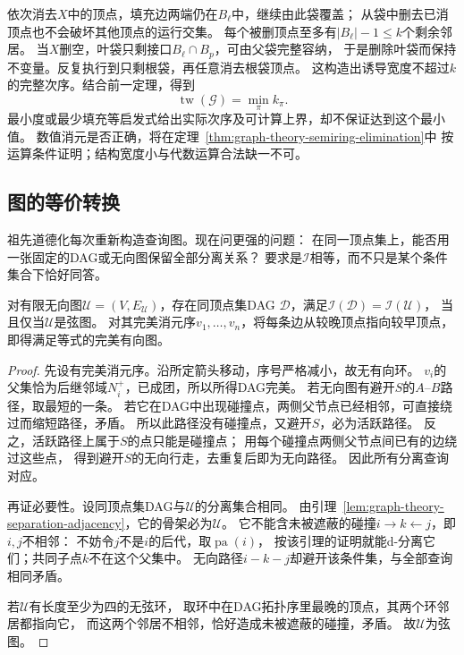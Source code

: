 依次消去\(X\)中的顶点，填充边两端仍在\(B_\ell\)中，继续由此袋覆盖；
从袋中删去已消顶点也不会破坏其他顶点的运行交集。
每个被删顶点至多有\(|B_\ell|-1\leq k\)个剩余邻居。
当\(X\)删空，叶袋只剩接口\(B_\ell\cap B_p\)，可由父袋完整容纳，
于是删除叶袋而保持不变量。反复执行到只剩根袋，再任意消去根袋顶点。
这构造出诱导宽度不超过\(k\)的完整次序。结合前一定理，得到
\[
  \operatorname{tw}(\mathcal G)=\min_\pi k_\pi.
\]
最小度或最少填充等启发式给出实际次序及可计算上界，却不保证达到这个最小值。
数值消元是否正确，将在定理~\ref{thm:graph-theory-semiring-elimination}中
按运算条件证明；结构宽度小与代数运算合法缺一不可。

\subsection{图的等价转换}
\label{sec:graph-theory-separation-correspondence}

祖先道德化每次重新构造查询图。现在问更强的问题：
在同一顶点集上，能否用一张固定的DAG或无向图保留全部分离关系？
要求是\(\mathcal I\)相等，而不只是某个条件集合下恰好同答。

\begin{theorem}[无向图的完美有向图表示]
  \label{thm:graph-theory-chordal-perfect}
  对有限无向图\(\mathcal U=(V,E_{\mathcal U})\)，存在同顶点集DAG
  \(\mathcal D\)，满足\(\mathcal I(\mathcal D)=\mathcal I(\mathcal U)\)，
  当且仅当\(\mathcal U\)是弦图。
  对其完美消元序\(v_1,\ldots,v_n\)，将每条边从较晚顶点指向较早顶点，
  即得满足等式的完美有向图。
\end{theorem}

\begin{proof}
先设有完美消元序。沿所定箭头移动，序号严格减小，故无有向环。
\(v_i\)的父集恰为后继邻域\(N_i^+\)，已成团，所以所得DAG完美。
若无向图有避开\(S\)的\(A\)--\(B\)路径，取最短的一条。
若它在DAG中出现碰撞点，两侧父节点已经相邻，可直接绕过而缩短路径，矛盾。
所以此路径没有碰撞点，又避开\(S\)，必为活跃路径。
反之，活跃路径上属于\(S\)的点只能是碰撞点；
用每个碰撞点两侧父节点间已有的边绕过这些点，
得到避开\(S\)的无向行走，去重复后即为无向路径。
因此所有分离查询对应。

再证必要性。设同顶点集DAG与\(\mathcal U\)的分离集合相同。
由引理~\ref{lem:graph-theory-separation-adjacency}，它的骨架必为\(\mathcal U\)。
它不能含未被遮蔽的碰撞\(i\to k\leftarrow j\)，即\(i,j\)不相邻：
不妨令\(j\)不是\(i\)的后代，取\(\operatorname{pa}(i)\)，
按该引理的证明就能d-分离它们；共同子点\(k\)不在这个父集中。
无向路径\(i-k-j\)却避开该条件集，与全部查询相同矛盾。

若\(\mathcal U\)有长度至少为四的无弦环，
取环中在DAG拓扑序里最晚的顶点，其两个环邻居都指向它，
而这两个邻居不相邻，恰好造成未被遮蔽的碰撞，矛盾。
故\(\mathcal U\)为弦图。
\end{proof}


